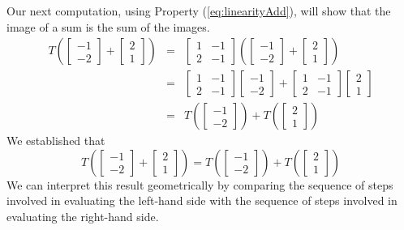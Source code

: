 \documentclass{ximera}
\begin{document}
\begin{exploration}
Our next computation, using Property (\ref{eq:linearityAdd}), will show that the image of a sum is the sum of the images.
\begin{eqnarray*}
T\left(\begin{bmatrix}-1\\-2\end{bmatrix}+\begin{bmatrix}2\\1\end{bmatrix}\right)&=&\begin{bmatrix}1&-1\\2&-1\end{bmatrix}\left(\begin{bmatrix}-1\\-2\end{bmatrix}+\begin{bmatrix}2\\1\end{bmatrix}\right)\\
&=&\begin{bmatrix}1&-1\\2&-1\end{bmatrix}\begin{bmatrix}-1\\-2\end{bmatrix}+\begin{bmatrix}1&-1\\2&-1\end{bmatrix}\begin{bmatrix}2\\1\end{bmatrix}\\
&=&T\left(\begin{bmatrix}-1\\-2\end{bmatrix}\right)+T\left(\begin{bmatrix}2\\1\end{bmatrix}\right)
\end{eqnarray*}
We established that
$$T\left(\begin{bmatrix}-1\\-2\end{bmatrix}+\begin{bmatrix}2\\1\end{bmatrix}\right)=T\left(\begin{bmatrix}-1\\-2\end{bmatrix}\right)+T\left(\begin{bmatrix}2\\1\end{bmatrix}\right)$$
We can interpret this result geometrically by comparing the sequence of steps involved in evaluating the left-hand side with the sequence of steps involved in evaluating the right-hand side.


\end{exploration}
\end{document}
